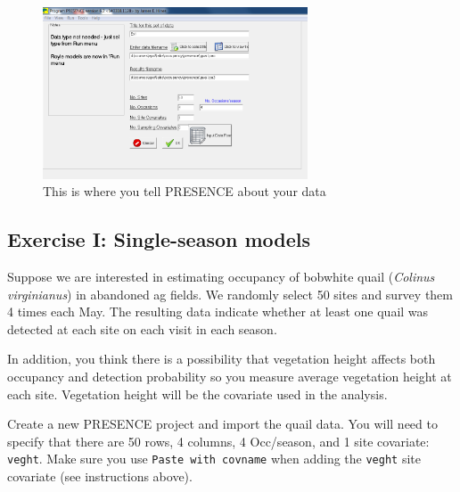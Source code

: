 \documentclass[12pt]{article}\usepackage[]{graphicx}\usepackage[]{color}
\begin{document}
\begin{figure}[h!]
  \centering
  \includegraphics[width=0.7\textwidth]{figs/pres-setup}
  \caption{\small This is where you tell PRESENCE about your data}
  \label{fig:pres-setup}
\end{figure}

\clearpage

\subsection*{Exercise I: Single-season models}

Suppose we are interested in estimating occupancy of bobwhite quail
({\it Colinus virginianus}) in abandoned ag fields. We randomly select
50 sites and survey them 4 times each May. The resulting data indicate
whether at least one quail was detected at each site on each visit in
each season.    

In addition, you think there is a possibility that vegetation height
affects both occupancy and detection probability so you measure
average vegetation height at each site. Vegetation height will be the
covariate used in the analysis. 

Create a new PRESENCE project and import the quail data. You will
need to specify that there are 50 rows, 4 columns, 4 Occ/season, and 1
site covariate: \texttt{veght}. Make sure you use \texttt{Paste with
  covname} when adding the \texttt{veght} site covariate (see
instructions above).  
\end{document}
